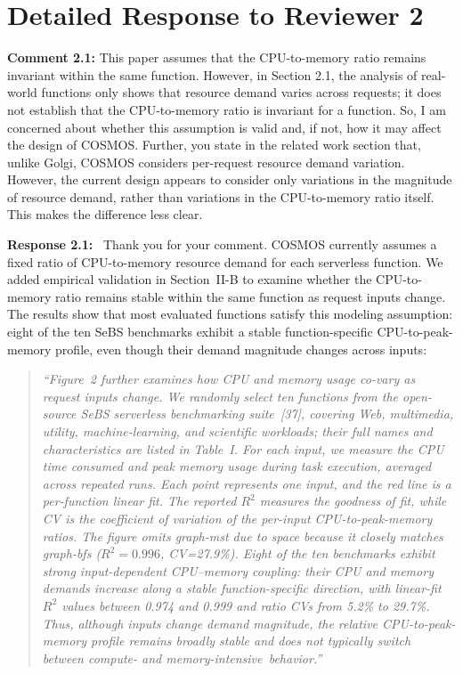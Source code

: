 \documentclass[11pt]{article}
\newcommand{\response}[1]{\par\medskip\noindent\textbf{Response #1:}\ }
\newenvironment{revisionquote}{\begin{quote}\itshape}{\end{quote}}
\begin{document}
\section*{Detailed Response to Reviewer 2}

\begin{reviewcomment}
\textbf{Comment 2.1:} This paper assumes that the CPU-to-memory ratio remains invariant within the same function. However, in Section 2.1, the analysis of real-world functions only shows that resource demand varies across requests; it does not establish that the CPU-to-memory ratio is invariant for a function. So, I am concerned about whether this assumption is valid and, if not, how it may affect the design of COSMOS. Further, you state in the related work section that, unlike Golgi, COSMOS considers per-request resource demand variation. However, the current design appears to consider only variations in the magnitude of resource demand, rather than variations in the CPU-to-memory ratio itself. This makes the difference less clear.
\end{reviewcomment}
\response{2.1} Thank you for your comment. COSMOS currently assumes a fixed ratio of CPU-to-memory resource demand for each serverless function. We added empirical validation in Section~II-B to examine whether the CPU-to-memory ratio remains stable within the same function as request inputs change. The results show that most evaluated functions satisfy this modeling assumption: eight of the ten SeBS benchmarks exhibit a stable function-specific CPU-to-peak-memory profile, even though their demand magnitude changes across inputs:

\begin{revisionquote}
``Figure~2 further examines how CPU and memory usage co-vary as request inputs change. We randomly select ten functions from the open-source SeBS serverless benchmarking suite~[37], covering Web, multimedia, utility, machine-learning, and scientific workloads; their full names and characteristics are listed in Table~I. For each input, we measure the CPU time consumed and peak memory usage during task execution, averaged across repeated runs. Each point represents one input, and the red line is a per-function linear fit. The reported $R^2$ measures the goodness of fit, while CV is the coefficient of variation of the per-input CPU-to-peak-memory ratios. The figure omits graph-mst due to space because it closely matches graph-bfs ($R^2=0.996$, CV=27.9\%). Eight of the ten benchmarks exhibit strong input-dependent CPU--memory coupling: their CPU and memory demands increase along a stable function-specific direction, with linear-fit $R^2$ values between 0.974 and 0.999 and ratio CVs from 5.2\% to 29.7\%. Thus, although inputs change demand magnitude, the relative CPU-to-peak-memory profile remains broadly stable and does not typically switch between compute- and memory-intensive~behavior.''
\end{revisionquote}
\end{document}

